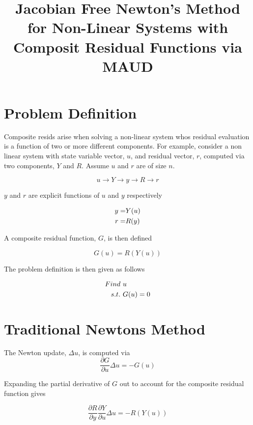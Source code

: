 \documentclass[12pt]{article}
\title {Jacobian Free Newton's Method for Non-Linear Systems with Composit Residual Functions via MAUD}
\begin{document}
\maketitle

\section{Problem Definition}

Composite resids arise when solving a non-linear system whos residual evaluation is a function of two
or more different components. For example, consider a non linear system with state variable vector, $u$, and
residual vector, $r$, computed via two components, $Y$ and $R$. Assume $u$ and $r$ are of size $n$.

\begin{equation}
  u \longrightarrow Y \longrightarrow y \longrightarrow R \longrightarrow r
\end{equation}

$y$ and $r$ are explicit functions of $u$ and $y$ respectively

\begin{align}
  y = & Y(u) \notag \\
  r = & R(y)
\end{align}

A composite residual function, $G$, is then defined

\begin{equation}
  G(u) = R(Y(u))
\end{equation}

The problem definition is then given as follows

\begin{align}
  Find &\  u \notag \\
  s.t. &\  G(u) = 0
\end{align}

\section{Traditional Newtons Method}

The Newton update, $\Delta u$, is computed via
\begin{equation}
  \frac{\partial G}{\partial u} \Delta u = -G(u)
\end{equation}

Expanding the partial derivative of $G$ out to account for the composite residual function
gives

\begin{equation}
  \frac{\partial R}{\partial y}  \frac{\partial Y}{\partial u} \Delta u = -R\left(Y(u)\right)
  \label{expanded_newton_iter}
\end{equation}
\end{document}
